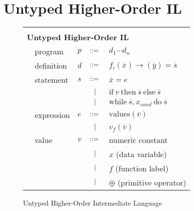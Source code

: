 \documentclass[preprint]{sigplanconf}
\begin{document}
\section{Untyped Higher-Order IL}
\begin{figure}[h!]
  \begin{tabular}{| m{0.01cm}m{1.5cm}m{0.1cm}m{0.2cm}p{4.5cm} |}
  \hline
  & & & &\\ 
   \multicolumn{5}{|l|}{\textbf{Untyped Higher-Order IL}}  \\[4pt]
  & program & $p$ &  $::=$   &  $d_1 \cdots d_n $ \\[4pt]
  & definition & $d$ & $::=$ & $f_i(\overline{x}) \rightarrow (\overline{y}) = \overline{s}$ \\[4pt]
  & statement  & $s$ & $::=$ & $\overline{x} = e $\\[2pt]
  &            &     & $\ \ | \ \ $    & $\mathrm{if} ~v~ \mathrm{then} ~ \overline{s} ~ \mathrm{else} ~ \overline{s} $ \\[2pt]
  &            &     & $\ \ | \ \ $    & $\mathrm{while} ~\overline{s}, x_{cond} ~ \mathrm{do} ~\overline{s}~ $  \\[5pt]
  & expression & $e$ & $::=$ & $\mathrm{values} (\overline{v})$ \\[2pt]
  &            &     & $\ \ | \ \ $    & $ v_f (\overline{v}) $ \\[9pt]
  & value      & $v$ & $::=$ & numeric constant \\[2pt]
  &            &     & $\ \ | \ \ $    &  $x$  \quad \small{(data variable)} \\[2pt]
  &            &     & $\ \ | \ \ $    &  $f$  \quad \small{(function label)} \\[2pt]
  &            &     & $\ \ | \ \ $    &  $\oplus$ \quad \small{(primitive operator)} \\[5pt]
  \hline
  \end{tabular}
\caption{Untyped Higher-Order Intermediate Language}
\end{figure}
\end{document}

